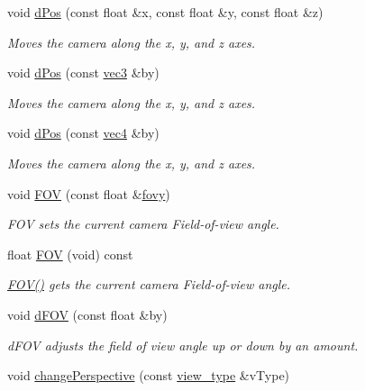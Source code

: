 \begin{DoxyCompactItemize}
void \hyperlink{class_camera_a2ac5f89b4f9f012dead66980925143c0}{d\-Pos} (const float \&x, const float \&y, const float \&z)
\begin{DoxyCompactList}\small\item\em \-Moves the camera along the x, y, and z axes. \end{DoxyCompactList}\item 
void \hyperlink{class_camera_a928de59670f0b31264307a8a0888b99d}{d\-Pos} (const \hyperlink{struct_angel_1_1vec3}{vec3} \&by)
\begin{DoxyCompactList}\small\item\em \-Moves the camera along the x, y, and z axes. \end{DoxyCompactList}\item 
void \hyperlink{class_camera_a4ec2e3d2a66826aedb1ac1eee7da0b96}{d\-Pos} (const \hyperlink{struct_angel_1_1vec4}{vec4} \&by)
\begin{DoxyCompactList}\small\item\em \-Moves the camera along the x, y, and z axes. \end{DoxyCompactList}\item 
void \hyperlink{class_camera_ac325bf616014d2e6023b84b6224630ac}{\-F\-O\-V} (const float \&\hyperlink{class_camera_acc8b97facc57059530efad534c2f8314}{fovy})
\begin{DoxyCompactList}\small\item\em \-F\-O\-V sets the current camera \-Field-\/of-\/view angle. \end{DoxyCompactList}\item 
float \hyperlink{class_camera_a8817ea073431268d8c0e522cdc30026c}{\-F\-O\-V} (void) const 
\begin{DoxyCompactList}\small\item\em \hyperlink{class_camera_a8817ea073431268d8c0e522cdc30026c}{\-F\-O\-V()} gets the current camera \-Field-\/of-\/view angle. \end{DoxyCompactList}\item 
void \hyperlink{class_camera_a55355b3376d195b17adcc6a5b72ae07b}{d\-F\-O\-V} (const float \&by)
\begin{DoxyCompactList}\small\item\em d\-F\-O\-V adjusts the field of view angle up or down by an amount. \end{DoxyCompactList}\item 
void \hyperlink{class_camera_aaadaebb40dc7262abc3f4bc52bc5bfb3}{change\-Perspective} (const \hyperlink{class_camera_afdccec6d447490dcc80ab6b99f21d0e5}{view\-\_\-type} \&v\-Type)

\end{DoxyCompactItemize}
